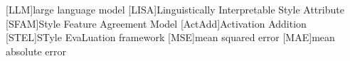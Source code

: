 
\begin{acronym}[ActAdd] %
  [LLM]{large language model}
  [LISA]{Linguistically Interpretable Style Attribute}
  [SFAM]{Style Feature Agreement Model}
  [ActAdd]{Activation Addition}
  [STEL]{STyle EvaLuation framework}
  [MSE]{mean squared error}
  [MAE]{mean absolute error}
\end{acronym}